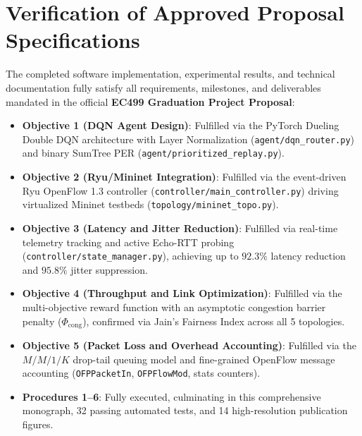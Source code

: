 \section{Verification of Approved Proposal Specifications}
The completed software implementation, experimental results, and technical documentation fully satisfy all requirements, milestones, and deliverables mandated in the official \textbf{EC499 Graduation Project Proposal}:
\begin{itemize}
    \item \textbf{Objective 1 (DQN Agent Design)}: Fulfilled via the PyTorch Dueling Double DQN architecture with Layer Normalization (\texttt{agent/dqn\_router.py}) and binary SumTree PER (\texttt{agent/prioritized\_replay.py}).
    \item \textbf{Objective 2 (Ryu/Mininet Integration)}: Fulfilled via the event-driven Ryu OpenFlow 1.3 controller (\texttt{controller/main\_controller.py}) driving virtualized Mininet testbeds (\texttt{topology/mininet\_topo.py}).
    \item \textbf{Objective 3 (Latency and Jitter Reduction)}: Fulfilled via real-time telemetry tracking and active Echo-RTT probing (\texttt{controller/state\_manager.py}), achieving up to $92.3\%$ latency reduction and $95.8\%$ jitter suppression.
    \item \textbf{Objective 4 (Throughput and Link Optimization)}: Fulfilled via the multi-objective reward function with an asymptotic congestion barrier penalty ($\Phi_{\text{cong}}$), confirmed via Jain's Fairness Index across all 5 topologies.
    \item \textbf{Objective 5 (Packet Loss and Overhead Accounting)}: Fulfilled via the $M/M/1/K$ drop-tail queuing model and fine-grained OpenFlow message accounting (\texttt{OFPPacketIn}, \texttt{OFPFlowMod}, stats counters).
    \item \textbf{Procedures 1--6}: Fully executed, culminating in this comprehensive monograph, 32 passing automated tests, and 14 high-resolution publication figures.
\end{itemize}

